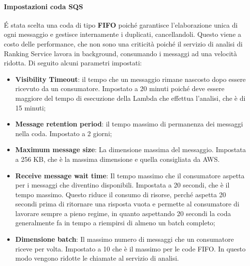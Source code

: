 \paragraph{Impostazioni coda SQS}
\'E stata scelta una coda di tipo \textbf{FIFO} poiché garantisce l'elaborazione unica di ogni messaggio e gestisce internamente i duplicati, cancellandoli. Questo viene a costo delle performance, che non sono una criticità poiché il servizio di analisi di Ranking Service lavora in background, consumando i messaggi ad una velocità ridotta.
Di seguito alcuni parametri impostati:
\begin{itemize}
\item \textbf{Visibility Timeout}: il tempo che un messaggio rimane nascosto dopo essere ricevuto da un consumatore. Impostato a 20 minuti poiché deve essere maggiore del tempo di esecuzione della Lambda che effettua l'analisi, che è di 15 minuti;
\item \textbf{Message retention period}: il tempo massimo di permanenza dei messaggi nella coda. Impostato a 2 giorni;
\item \textbf{Maximum message size}: La dimensione massima del messaggio. Impostata a 256 KB, che è la massima dimensione e quella consigliata da AWS.
\item \textbf{Receive message wait time}: Il tempo massimo che il consumatore aspetta per i messaggi che diventino disponibili. Impostata a 20 secondi, che è il tempo massimo. Questo riduce il consumo di risorse, perché aspetta 20 secondi prima di ritornare una risposta vuota e permette al consumatore di lavorare sempre a pieno regime, in quanto aspettando 20 secondi la coda generalmente fa in tempo a riempirsi di almeno un batch completo;
\item \textbf{Dimensione batch}: Il massimo numero di messaggi che un consumatore riceve per volta. Impostato a 10 che è il massimo per le code FIFO. In questo modo vengono ridotte le chiamate al servizio di analisi.
\end{itemize}

